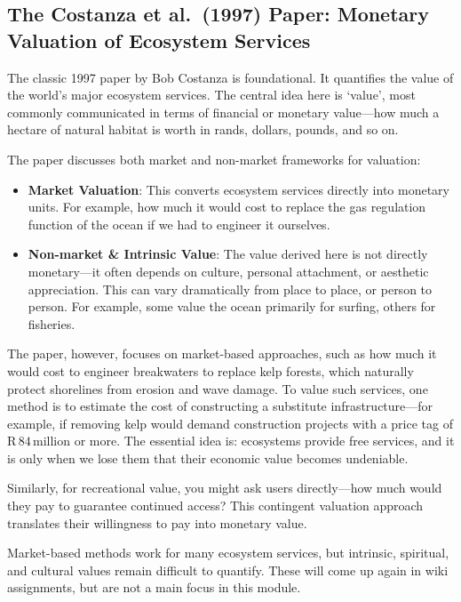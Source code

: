 \documentclass[
  11pt,
]{book}
\providecommand{\tightlist}{%
  \setlength{\itemsep}{0pt}\setlength{\parskip}{0pt}}
\begin{document}
\subsection{The Costanza et al.~(1997) Paper: Monetary Valuation of
Ecosystem
Services}\label{the-costanza-et-al.-1997-paper-monetary-valuation-of-ecosystem-services}

The classic 1997 paper by Bob Costanza is foundational. It quantifies
the value of the world's major ecosystem services. The central idea here
is `value', most commonly communicated in terms of financial or monetary
value---how much a hectare of natural habitat is worth in rands,
dollars, pounds, and so on.

The paper discusses both market and non-market frameworks for valuation:

\begin{itemize}
\tightlist
\item
  \textbf{Market Valuation}: This converts ecosystem services directly
  into monetary units. For example, how much it would cost to replace
  the gas regulation function of the ocean if we had to engineer it
  ourselves.
\item
  \textbf{Non-market \& Intrinsic Value}: The value derived here is not
  directly monetary---it often depends on culture, personal attachment,
  or aesthetic appreciation. This can vary dramatically from place to
  place, or person to person. For example, some value the ocean
  primarily for surfing, others for fisheries.
\end{itemize}

The paper, however, focuses on market-based approaches, such as how much
it would cost to engineer breakwaters to replace kelp forests, which
naturally protect shorelines from erosion and wave damage. To value such
services, one method is to estimate the cost of constructing a
substitute infrastructure---for example, if removing kelp would demand
construction projects with a price tag of
\(\text{R}\,84\,\text{million}\) or more. The essential idea is:
ecosystems provide free services, and it is only when we lose them that
their economic value becomes undeniable.

Similarly, for recreational value, you might ask users directly---how
much would they pay to guarantee continued access? This contingent
valuation approach translates their willingness to pay into monetary
value.

Market-based methods work for many ecosystem services, but intrinsic,
spiritual, and cultural values remain difficult to quantify. These will
come up again in wiki assignments, but are not a main focus in this
module.
\end{document}
